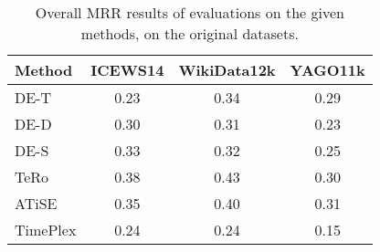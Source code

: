 \begin{table}[htb]
\centering
\begin{minipage}{\columnwidthcaption}
\centering
\caption{Overall MRR results of evaluations on the given methods, on the original datasets.}
\vspace{-3mm}

\begin{tabular}{l|ccc}
\hline
Method & ICEWS14 & WikiData12k & YAGO11k\\
\hline
DE-T     & 0.23 & 0.34 & 0.29 \\
DE-D     & 0.30 & 0.31 & 0.23 \\
DE-S     & 0.33 & 0.32 & 0.25 \\
TeRo     & 0.38 & 0.43 & 0.30 \\
ATiSE    & 0.35 & 0.40 & 0.31 \\
TimePlex & 0.24 & 0.24 & 0.15 \\
\hline

\end{tabular}

\label{tab:overall_results}
\end{minipage}
\end{table}
